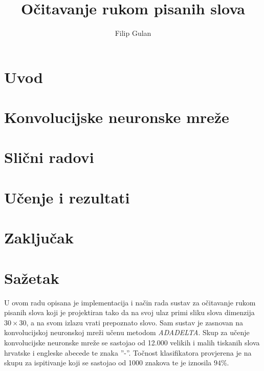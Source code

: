 \documentclass[times, utf8, seminar, numeric]{fer}
\begin{document}
\title{Očitavanje rukom pisanih slova}
\author{Filip Gulan}

\maketitle

\tableofcontents

\chapter{Uvod}


\chapter{Konvolucijske neuronske mreže}


\chapter{Slični radovi}


\chapter{Učenje i rezultati}


\chapter{Zaključak}





\chapter{Sažetak}
U ovom radu opisana je implementacija i način rada sustav za očitavanje rukom pisanih slova koji je projektiran tako da na svoj ulaz primi sliku slova dimenzija $30 \times 30$, a na svom izlazu vrati prepoznato slovo. Sam sustav je zasnovan na konvolucijskoj neuronskoj mreži učenu metodom \emph{ADADELTA}. Skup za učenje konvolucijske neuronske mreže se sastojao od \num{12,000} velikih i malih tiskanih slova hrvatske i engleske abecede te znaka ''-''. Točnost klasifikatora provjerena je na skupu za ispitivanje koji se sastojao od \num{1000} znakova te je iznosila $94 \%$.
\end{document}
